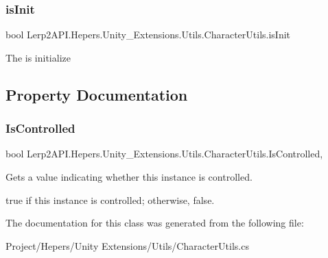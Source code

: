 \subsubsection{\texorpdfstring{is\+Init}{isInit}}
{\footnotesize\ttfamily bool Lerp2\+A\+P\+I.\+Hepers.\+Unity\+\_\+\+Extensions.\+Utils.\+Character\+Utils.\+is\+Init\hspace{0.3cm}{\ttfamily [static]}}



The is initialize 



\subsection{Property Documentation}
\mbox{\label{class_lerp2_a_p_i_1_1_hepers_1_1_unity___extensions_1_1_utils_1_1_character_utils_a1c4ec64f4a43cd0de27a292721d2f637}} 
\subsubsection{\texorpdfstring{Is\+Controlled}{IsControlled}}
{\footnotesize\ttfamily bool Lerp2\+A\+P\+I.\+Hepers.\+Unity\+\_\+\+Extensions.\+Utils.\+Character\+Utils.\+Is\+Controlled\hspace{0.3cm}{\ttfamily [static]}, {\ttfamily [get]}}



Gets a value indicating whether this instance is controlled. 

{\ttfamily true} if this instance is controlled; otherwise, {\ttfamily false}.

The documentation for this class was generated from the following file\+:\begin{DoxyCompactItemize}
\item 
Project/\+Hepers/\+Unity Extensions/\+Utils/Character\+Utils.\+cs\end{DoxyCompactItemize}
